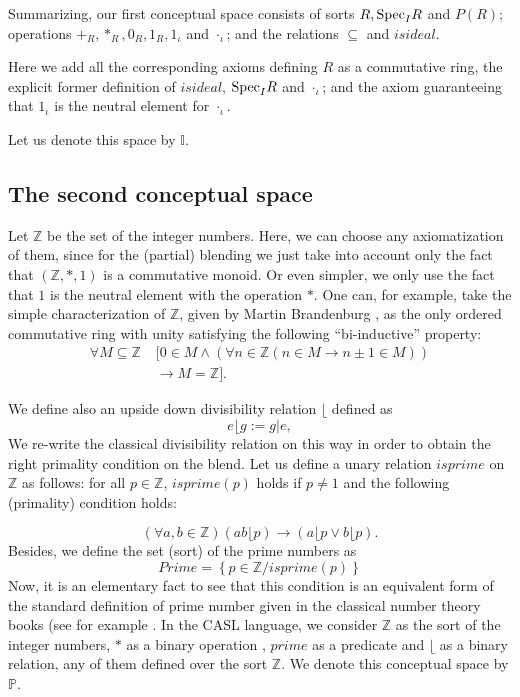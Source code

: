 Summarizing, our first conceptual space consists of sorts $R, {\rm Spec}_IR$ and $P(R)$; operations $+_R, *_R, 0_R, 1_R, 1_{\iota}$ and $
\cdot_{\iota}$; and the relations $\subseteq$ and $isideal$.

Here we add all the corresponding axioms defining $R$ as a commutative ring, the explicit former definition of $isideal$, ${\rm Spec}_IR$ and $\cdot_{\iota}$; and the axiom guaranteeing that  $1_{\iota}$ is the neutral element for $\cdot_{\iota}$.
 
Let us denote this space by $\mathbb{I}$.

\subsection{The second conceptual space}
Let $\mathbb{Z}$ be the set of the integer numbers. Here, we can
choose any axiomatization of them, since for the (partial) blending we
just take into account only the fact that $(\mathbb{Z},*,1)$ is a
commutative monoid. Or even simpler, we only use the fact that $1$ is
the neutral element with the operation $*$. One can, for example, take
the simple characterization of $\mathbb{Z}$, given by Martin
Brandenburg \citep{brandenburgdobleinduction}, as the only ordered
commutative ring with unity satisfying the following ``bi-inductive''
property:
\begin{align*}
  \label{eq:int}
  \forall M \subseteq \mathbb{Z}\;  & [ 0 \in M \wedge (\forall n \in \mathbb{Z} (n\in M \rightarrow n\pm 1 \in M))\\
  & \rightarrow M=\mathbb{Z}].
\end{align*}

We define also an upside down divisibility relation $\big\lfloor$ defined as 
\[e\big\lfloor g:=g\big|e,\] We re-write the classical divisibility
relation on this way in order to obtain the right primality condition
on the blend.  Let us define a unary relation $isprime$ on
$\mathbb{Z}$ as follows: for all $p\in \mathbb{Z}$, $isprime(p)$ holds
if $p\neq 1$ and the following (primality) condition holds:

\[(\forall a,b\in \mathbb{Z})(ab \big\lfloor p)\rightarrow (a \big\lfloor p \vee b \big\lfloor p).\] 
Besides, we define the set (sort) of the prime numbers as 
\[ Prime=\left\{ p\in \mathbb{Z}/ isprime(p)\right\}\] Now, it is an
elementary fact to see that this condition is an equivalent form of
the standard definition of prime number given in the classical number
theory books (see for example \cite{Apostol76}. In the CASL language,
  we consider $\mathbb{Z}$ as the sort of the integer numbers, $*$ as
  a binary operation , $prime$ as a predicate and $\big\lfloor$ as a
  binary relation, any of them defined over the sort $\mathbb{Z}$.
  \newline\indent We denote this conceptual space by $\mathbb{P}$.

